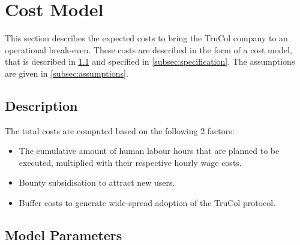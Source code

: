 \section{Cost Model}\label{sec:cost_model}
This section describes the expected costs to bring the TruCol company to an operational break-even. These costs are described in the form of a cost model, that is described in \cref{subsec:model_description} and specified in \cref{subsec:specification}. The assumptions are given in \cref{subsec:assumptions}.

\subsection{Description}\label{subsec:model_description}
The total costs are computed based on the following 2 factors:
\begin{itemize}
	\item The cumulative amount of human labour hours that are planned to be executed, multiplied with their respective hourly wage costs.
	\item Bounty subsidisation to attract new users.
	\item Buffer costs to generate wide-spread adoption of the TruCol protocol.
\end{itemize}

\subsection{Model Parameters}\label{subsec:model_parameters}

\ifx\homepath\overleafhome
\else
\fi
